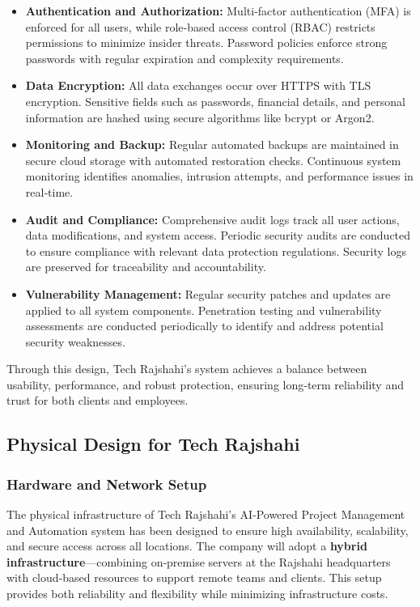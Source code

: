 \documentclass[12pt,a4paper]{article}
\begin{document}
\begin{itemize}
    \item \textbf{Authentication and Authorization:} Multi‑factor authentication (MFA) is enforced for all users, while role‑based access control (RBAC) restricts permissions to minimize insider threats.  Password policies enforce strong passwords with regular expiration and complexity requirements.
    
    \item \textbf{Data Encryption:} All data exchanges occur over HTTPS with TLS encryption.  Sensitive fields such as passwords, financial details, and personal information are hashed using secure algorithms like bcrypt or Argon2.
    
    \item \textbf{Monitoring and Backup:} Regular automated backups are maintained in secure cloud storage with automated restoration checks.  Continuous system monitoring identifies anomalies, intrusion attempts, and performance issues in real‑time.
    
    \item \textbf{Audit and Compliance:} Comprehensive audit logs track all user actions, data modifications, and system access.  Periodic security audits are conducted to ensure compliance with relevant data protection regulations.  Security logs are preserved for traceability and accountability.
    
    \item \textbf{Vulnerability Management:} Regular security patches and updates are applied to all system components.  Penetration testing and vulnerability assessments are conducted periodically to identify and address potential security weaknesses.
\end{itemize}

Through this design, Tech Rajshahi's system achieves a balance between usability, performance, and robust protection, ensuring long‑term reliability and trust for both clients and employees.

\subsection{Physical Design for Tech Rajshahi}

\subsubsection{Hardware and Network Setup}
The physical infrastructure of Tech Rajshahi's AI‑Powered Project Management and Automation system has been designed to ensure high availability, scalability, and secure access across all locations.  The company will adopt a \textbf{hybrid infrastructure}—combining on‑premise servers at the Rajshahi headquarters with cloud‑based resources to support remote teams and clients.  This setup provides both reliability and flexibility while minimizing infrastructure costs.
\end{document}
